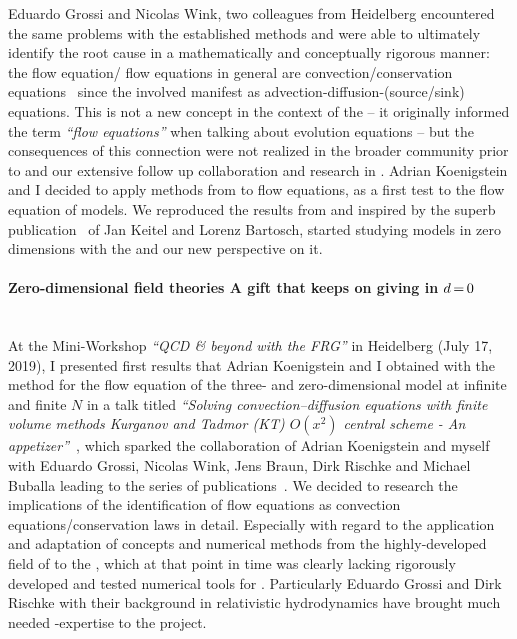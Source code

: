 Eduardo Grossi and Nicolas Wink, two colleagues from Heidelberg encountered the same problems with the established methods and were able to ultimately identify the root cause in a mathematically and conceptually rigorous manner: the \lpa{} flow equation/\frg{} flow equations in general are convection/conservation equations~\cite{Grossi:2021ksl} since the involved \pdes{} manifest as advection-diffusion-(source/sink) equations.
This is not a new concept in the context of the \rg{} \nolinebreak[3]-- it originally informed the term \textit{``flow equations''} when talking about \rg{} evolution equations \nolinebreak[3]-- but the consequences of this connection were not realized in the broader \frg{} community prior to  and our extensive follow up collaboration and research in .
Adrian Koenigstein and I decided to apply \fv{} methods from \cfd{} to \frg{} flow equations, \viz{} as a first test to the \lpa{} flow equation of \ON{} models. 
We reproduced the results from  and inspired by the superb publication~\cite{Keitel:2011pn} of Jan Keitel and Lorenz Bartosch, started studying \ON{} models in zero dimensions with the \frg{} and our new \cfd{} perspective on it.

\paragraph{Zero-dimensional field theories \dash{} A gift that keeps on giving in $d\mkern-2mu=\mkern-2mu0$}\label{paragraph:introZeroD}\mbox{}\\%
At the Mini-Workshop \textit{``QCD \& beyond with the FRG''} in Heidelberg (July 17, 2019), I presented first results that Adrian Koenigstein and I obtained with the \fv{} method for the \lpa{} flow equation of the three- and zero-dimensional
\ON{} model at infinite and finite $N$ in a talk titled \textit{``Solving  convection–diffusion equations with finite volume methods Kurganov and Tadmor (KT) $O(x^2)$ central scheme - An appetizer''}~\cite{Steil:2019Talk}, which sparked the collaboration of Adrian Koenigstein and myself with Eduardo Grossi, Nicolas Wink, Jens Braun, Dirk Rischke and Michael Buballa leading to the series of publications~\cite{zerod1,zerod2,zerod3}.
We decided to research the implications of the identification of \frg{} flow equations as convection equations/conservation laws in detail. 
Especially with regard to the application and adaptation of concepts and numerical methods from the  highly-developed field of \cfd{} to the \frg{}, which at that point in time was clearly lacking rigorously developed and tested numerical tools for \pdes{}.
Particularly Eduardo Grossi and Dirk Rischke with their background in relativistic hydrodynamics have brought much needed \cfd{}-expertise to the project.

